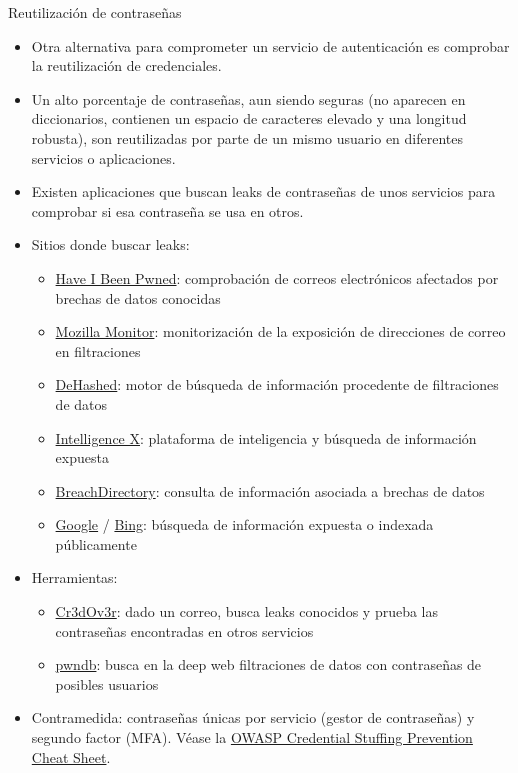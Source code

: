 \documentclass[aspectratio=169,11pt]{beamer}
\begin{document}
\begin{frame}[allowframebreaks]{Reutilización de contraseñas}
\small
  \begin{itemize}
  \item Otra alternativa para comprometer un servicio de autenticación es comprobar la reutilización de credenciales.
  \item Un alto porcentaje de contraseñas, aun siendo seguras (no aparecen en diccionarios, contienen un espacio de caracteres elevado y una longitud robusta), son reutilizadas por parte de un mismo usuario en diferentes servicios o aplicaciones.
  \item Existen aplicaciones que buscan leaks de contraseñas de unos servicios para comprobar si esa contraseña se usa en otros.
  \item Sitios donde buscar leaks:
    \begin{itemize}
    \item \href{https://haveibeenpwned.com/}{Have I Been Pwned}: comprobación de correos electrónicos afectados por brechas de datos conocidas
    \item \href{https://monitor.mozilla.org/}{Mozilla Monitor}: monitorización de la exposición de direcciones de correo en filtraciones
    \item \href{https://dehashed.com/}{DeHashed}: motor de búsqueda de información procedente de filtraciones de datos
    \item \href{https://intelx.io/}{Intelligence X}: plataforma de inteligencia y búsqueda de información expuesta
    \item \href{https://breachdirectory.org/}{BreachDirectory}: consulta de información asociada a brechas de datos
    \item \href{https://www.google.com/}{Google} / \href{https://www.bing.com/}{Bing}: búsqueda de información expuesta o indexada públicamente
    \end{itemize}
  \item Herramientas:
    \begin{itemize}
    \item \href{https://github.com/D4Vinci/Cr3dOv3r}{Cr3dOv3r}: dado un correo, busca leaks conocidos y prueba las contraseñas encontradas en otros servicios
    \item \href{https://pwndb.com}{pwndb}: busca en la deep web filtraciones de datos con contraseñas de posibles usuarios
    \end{itemize}
  \item Contramedida: contraseñas únicas por servicio (gestor de contraseñas) y segundo factor (MFA). Véase la \href{https://cheatsheetseries.owasp.org/cheatsheets/Credential_Stuffing_Prevention_Cheat_Sheet.html}{OWASP Credential Stuffing Prevention Cheat Sheet}.
  \end{itemize}
\end{frame}
\end{document}
